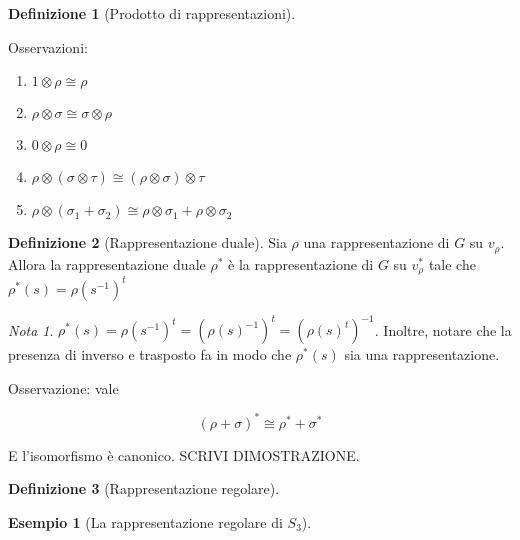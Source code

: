 \documentclass[11pt]{article}
\theoremstyle{plain}
\theoremstyle{definition}
\newtheorem{defn}{Definizione}[section]
\newtheorem{exmp}{Esempio}[section]
\theoremstyle{remark}
\newtheorem*{note}{Nota}
\begin{document}
\begin{defn}[Prodotto di rappresentazioni]

\label{defn:prodotto di rappresentazioni}
\end{defn}


Osservazioni:


\begin{enumerate}
\item $1\otimes \rho \cong \rho$
\item $\rho \otimes \sigma \cong \sigma \otimes \rho$
\item $0 \otimes \rho \cong 0$
\item $\rho \otimes (\sigma \otimes \tau) \cong (\rho \otimes \sigma)\otimes \tau$
\item $\rho \otimes (\sigma_1 + \sigma_2) \cong \rho \otimes \sigma_1 + \rho \otimes \sigma_2$

\end{enumerate}





\begin{defn}[Rappresentazione duale]
Sia $\rho$ una rappresentazione di $G$ su $v_\rho$. Allora la rappresentazione duale $\rho^*$ è la rappresentazione di $G$ su $v_\rho ^*$ tale che $\rho^*(s)=\rho(s^{-1})^t$
\label{defn:rappresentazione duale}
\end{defn}

\begin{note}
$\rho^*(s)=\rho(s^{-1})^t=\left(\rho(s)^{-1}\right)^t=\left(\rho(s)^t\right)^{-1}$. Inoltre, notare che la presenza di inverso e trasposto fa in modo che $\rho^*(s)$ sia una rappresentazione.
\end{note}


Osservazione: vale

\[ (\rho + \sigma)^* \cong \rho^* + \sigma^* \]

E l'isomorfismo è canonico. SCRIVI DIMOSTRAZIONE.





\begin{defn}[Rappresentazione regolare]

\label{defn:rappresentazione regolare}
\end{defn}

\begin{exmp}[La rappresentazione regolare di $S_3$]


\end{exmp}
\end{document}

